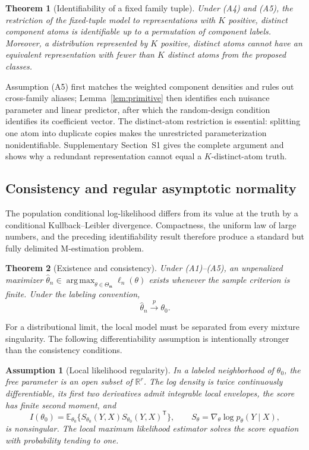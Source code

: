 \documentclass[a4paper,fleqn]{cas-sc}
\newtheorem{theorem}{Theorem}
\newtheorem{assumption}{Assumption}
\DeclareMathOperator*{\argmax}{arg\,max}
\newcommand{\E}{\mathbb E}
\newcommand{\R}{\mathbb R}
\newcommand{\T}{\mathsf T}
\newcommand{\model}{\mathfrak m}
\begin{document}
\begin{theorem}[Identifiability of a fixed family tuple]
\label{thm:ident}
Under (A4) and (A5), the restriction of the fixed-tuple model to representations with $K$ positive, distinct component atoms is identifiable up to a permutation of component labels. Moreover, a distribution represented by $K$ positive, distinct atoms cannot have an equivalent representation with fewer than $K$ distinct atoms from the proposed classes.
\end{theorem}

Assumption (A5) first matches the weighted component densities and rules out cross-family aliases; Lemma~\ref{lem:primitive} then identifies each nuisance parameter and linear predictor, after which the random-design condition identifies its coefficient vector. The distinct-atom restriction is essential: splitting one atom into duplicate copies makes the unrestricted parameterization nonidentifiable. Supplementary Section~S1 gives the complete argument and shows why a redundant representation cannot equal a $K$-distinct-atom truth.

\subsection{Consistency and regular asymptotic normality}
\label{sec:regular-theory}

The population conditional log-likelihood differs from its value at the truth by a conditional Kullback--Leibler divergence. Compactness, the uniform law of large numbers, and the preceding identifiability result therefore produce a standard but fully delimited M-estimation problem.

\begin{theorem}[Existence and consistency]
\label{thm:consistency}
Under (A1)--(A5), an unpenalized maximizer $\widehat\theta_n\in\argmax_{\theta\in\Theta_{\model}}\ell_n(\theta)$ exists whenever the sample criterion is finite. Under the labeling convention,
\[
  \widehat\theta_n\xrightarrow{p}\theta_0.
\]
\end{theorem}

For a distributional limit, the local model must be separated from every mixture singularity. The following differentiability assumption is intentionally stronger than the consistency conditions.

\begin{assumption}[Local likelihood regularity]
\label{ass:local}
In a labeled neighborhood of $\theta_0$, the free parameter is an open subset of $\R^r$. The log density is twice continuously differentiable, its first two derivatives admit integrable local envelopes, the score has finite second moment, and
\[
 I(\theta_0)=\E_{\theta_0}\{S_{\theta_0}(Y,X)S_{\theta_0}(Y,X)^\T\},
 \qquad S_\theta=\nabla_\theta\log p_\theta(Y\mid X),
\]
is nonsingular. The local maximum likelihood estimator solves the score equation with probability tending to one.
\end{assumption}
\end{document}
